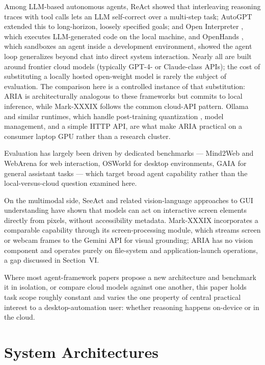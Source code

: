 \documentclass[conference]{IEEEtran}
\begin{document}
Among LLM-based autonomous agents, ReAct \cite{ref4} showed that interleaving reasoning traces with tool calls lets an LLM self-correct over a multi-step task; AutoGPT \cite{ref6} extended this to long-horizon, loosely specified goals; and Open Interpreter \cite{ref7}, which executes LLM-generated code on the local machine, and OpenHands \cite{ref8}, which sandboxes an agent inside a development environment, showed the agent loop generalizes beyond chat into direct system interaction. Nearly all are built around frontier cloud models (typically GPT-4- or Claude-class \cite{ref9} APIs); the cost of substituting a locally hosted open-weight model is rarely the subject of evaluation. The comparison here is a controlled instance of that substitution: ARIA is architecturally analogous to these frameworks but commits to local inference, while Mark-XXXIX follows the common cloud-API pattern. Ollama \cite{ref2} and similar runtimes, which handle post-training quantization \cite{ref20}, model management, and a simple HTTP API, are what make ARIA practical on a consumer laptop GPU rather than a research cluster.

Evaluation has largely been driven by dedicated benchmarks --- Mind2Web \cite{ref16} and WebArena \cite{ref17} for web interaction, OSWorld \cite{ref18} for desktop environments, GAIA \cite{ref19} for general assistant tasks --- which target broad agent capability rather than the local-versus-cloud question examined here.

On the multimodal side, SeeAct \cite{ref10} and related vision-language approaches to GUI understanding have shown that models can act on interactive screen elements directly from pixels, without accessibility metadata. Mark-XXXIX incorporates a comparable capability through its screen-processing module, which streams screen or webcam frames to the Gemini API for visual grounding; ARIA has no vision component and operates purely on file-system and application-launch operations, a gap discussed in Section~VI.

Where most agent-framework papers propose a new architecture and benchmark it in isolation, or compare cloud models against one another, this paper holds task scope roughly constant and varies the one property of central practical interest to a desktop-automation user: whether reasoning happens on-device or in the cloud.

\section{System Architectures}
\end{document}
